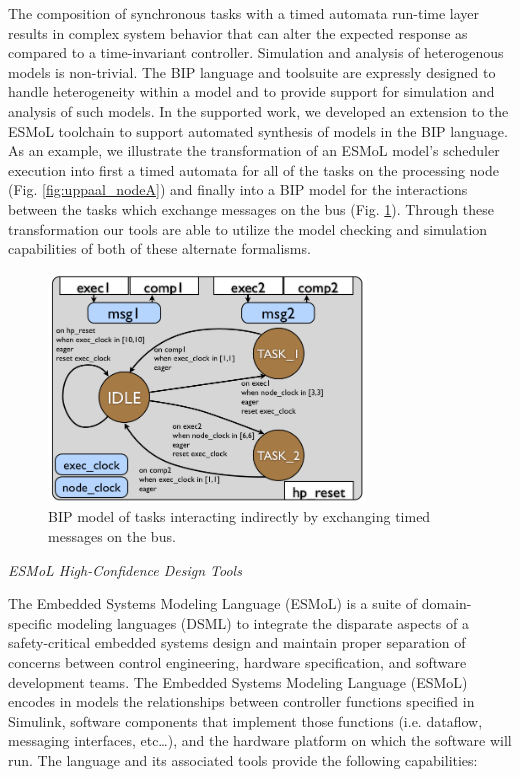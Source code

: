 The composition of synchronous tasks with a timed automata run-time layer results in complex system behavior that can alter the expected response as compared to a time-invariant controller\cite{gh_dissertation}.  Simulation and analysis of heterogenous models is non-trivial.  The BIP language and toolsuite are expressly designed to handle heterogeneity within a model and to provide support for simulation and analysis of such models\cite{bipref}.  In the supported work, we developed an extension to the ESMoL toolchain to support automated synthesis of models in the BIP language.  As an example, we illustrate the transformation of an ESMoL model's scheduler execution into first a timed automata for all of the tasks on the processing node (Fig. \ref{fig:uppaal_nodeA}) and finally into a BIP model for the interactions between the tasks which exchange messages on the bus (Fig. \ref{fig:task_model}).  Through these transformation our tools are able to utilize the model checking and simulation capabilities of both of these alternate formalisms.

\begin{figure}[thpb]
\centering
\includegraphics[width=0.75\textwidth]{img/task_model.png}
\caption{BIP model of tasks interacting indirectly by exchanging timed messages on the bus.}
\label{fig:task_model}
\end{figure}


\emph{ESMoL High-Confidence Design Tools}

The Embedded 
Systems Modeling Language (ESMoL) is a suite of 
domain-specific modeling languages (DSML) to integrate the 
disparate aspects of a safety-critical embedded systems design 
and maintain proper separation of concerns between control 
engineering, hardware specification, and software development 
teams\cite{jp_esmol}.  The Embedded Systems Modeling Language (ESMoL) encodes 
in models the relationships between controller functions
specified in Simulink, software components that implement
those functions (i.e. dataflow, messaging interfaces, 
etc\ldots), and the hardware platform on which the software
will run. The language and its associated tools provide the following capabilities:


